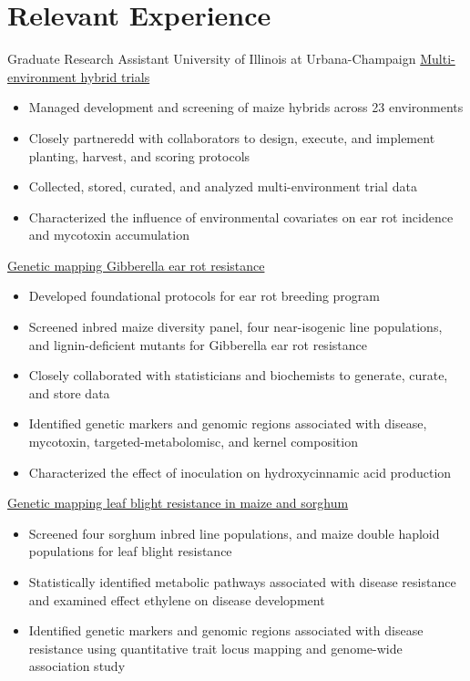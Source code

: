 \section*{Relevant Experience}

    {Graduate Research Assistant}
    {University of Illinois at Urbana-Champaign}
    {}
\noindent 
\underline{Multi-environment hybrid trials}
    \begin{itemize}
        \item Managed development and screening of maize hybrids across 23 environments
        \item Closely partneredd with collaborators to design, execute, and implement planting, harvest, and scoring protocols
        \item Collected, stored, curated, and analyzed multi-environment trial data
        \item Characterized the influence of environmental covariates on ear rot incidence and mycotoxin accumulation 
\end{itemize}
\noindent
\underline{Genetic mapping Gibberella ear rot resistance}
    \begin{itemize}
        \item Developed foundational protocols for ear rot breeding program
        \item Screened inbred maize diversity panel, four near-isogenic line populations, and lignin-deficient mutants for Gibberella ear rot resistance
        \item Closely collaborated with statisticians and biochemists to generate, curate, and store data
        \item Identified genetic markers and genomic regions associated with disease, mycotoxin, targeted-metabolomisc, and kernel composition
        \item Characterized the effect of inoculation on hydroxycinnamic acid production
\end{itemize}
\noindent
\underline{Genetic mapping leaf blight resistance in maize and sorghum}
    \begin{itemize}
        \item Screened four sorghum inbred line populations, and maize double haploid populations for leaf blight resistance 
        \item Statistically identified metabolic pathways associated with disease resistance and examined effect ethylene on disease development
        \item Identified genetic markers and genomic regions associated with disease resistance using quantitative trait locus mapping and genome-wide association study
\end{itemize}
